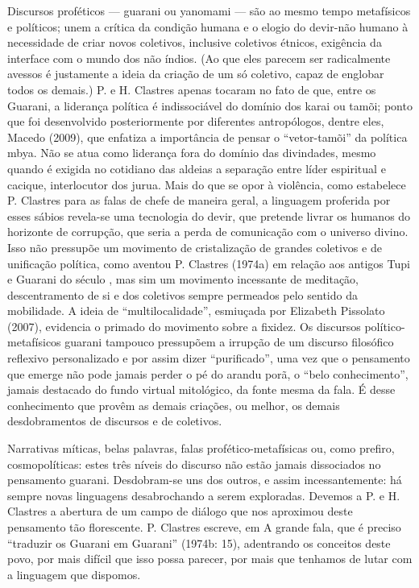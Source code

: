 Discursos proféticos — guarani ou yanomami — são ao mesmo tempo
metafísicos e políticos; unem a crítica da condição humana e o elogio
do devir-não humano à necessidade de criar novos coletivos, inclusive
coletivos étnicos, exigência da interface com o mundo dos não índios.
(Ao que eles parecem ser radicalmente avessos é justamente a ideia da
criação de um só coletivo, capaz de englobar todos os demais.) P. e H.
Clastres apenas tocaram no fato de que, entre os Guarani, a liderança
política é indissociável do domínio dos karai ou tamõi; ponto que foi
desenvolvido posteriormente por diferentes antropólogos, dentre eles,
Macedo (2009), que enfatiza a importância de pensar o ``vetor-tamõi'' da
política mbya. Não se atua como liderança fora do domínio das
divindades, mesmo quando é exigida no cotidiano das aldeias a separação
entre líder espiritual e cacique, interlocutor dos jurua. Mais do que
se opor à violência, como estabelece P. Clastres para as falas de chefe
de maneira geral, a linguagem proferida por esses sábios revela-se uma
tecnologia do devir, que pretende livrar os humanos do horizonte de
corrupção, que seria a perda de comunicação com o universo divino. Isso
não pressupõe um movimento de cristalização de grandes coletivos e de
unificação política, como aventou P. Clastres (1974a) em relação aos
antigos Tupi e Guarani do século , mas sim um movimento incessante
de meditação, descentramento de si e dos coletivos sempre permeados
pelo sentido da mobilidade. A ideia de ``multilocalidade'', esmiuçada por
Elizabeth Pissolato (2007), evidencia o primado do movimento sobre a
fixidez. Os discursos político-metafísicos guarani tampouco pressupõem
a irrupção de um discurso filosófico reflexivo personalizado e por
assim dizer ``purificado'', uma vez que o pensamento que emerge não pode
jamais perder o pé do arandu porã, o ``belo conhecimento'', jamais
destacado do fundo virtual mitológico, da fonte mesma da fala. É desse
conhecimento que provêm as demais criações, ou melhor, os demais
desdobramentos de discursos e de coletivos.

Narrativas míticas, belas palavras, falas profético-metafísicas ou, como
prefiro, cosmopolíticas: estes três níveis do discurso não estão jamais
dissociados no pensamento guarani. Desdobram-se uns dos outros, e assim
incessantemente: há sempre novas linguagens desabrochando a serem
exploradas. Devemos a P. e H. Clastres a abertura de um campo de
diálogo que nos aproximou deste pensamento tão florescente. P. Clastres
escreve, em A grande fala, que é preciso ``traduzir os Guarani em
Guarani'' (1974b: 15), adentrando os conceitos deste povo, por mais
difícil que isso possa parecer, por mais que tenhamos de lutar com a
linguagem que dispomos. 

